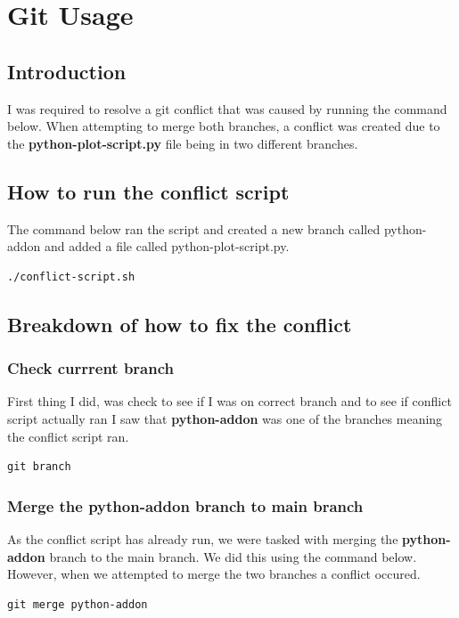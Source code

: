 \documentclass[]{article}
\begin{document}
\section{Git Usage}
\subsection{Introduction}
I was required to resolve a git conflict that was caused by running the command below. When attempting to merge both branches,
a conflict was created due to the \textbf{python-plot-script.py} file being in two different branches.
\subsection{How to run the conflict script}
The command below ran the script and created a new branch called python-addon and added a file called python-plot-script.py.
\begin{tcolorbox}[colback=white, colframe=black, boxrule=1pt, arc=2mm, 
    fonttitle=\bfseries, listing only, listing options={language=sh, basicstyle=\ttfamily}]
\begin{verbatim}
./conflict-script.sh
\end{verbatim}
\end{tcolorbox}
\subsection{Breakdown of how to fix the conflict}
\subsubsection{Check currrent branch}
First thing I did, was check to see if I was on correct branch and to see if conflict script actually ran
I saw that \textbf{python-addon} was one of the branches meaning the conflict script ran.
\begin{tcolorbox}[colback=white, colframe=black, boxrule=1pt, arc=2mm, 
    fonttitle=\bfseries, listing only, listing options={language=sh, basicstyle=\ttfamily}]
\begin{verbatim}
git branch
\end{verbatim}
\end{tcolorbox}
\subsubsection{Merge the python-addon branch to main branch}
As the conflict script has already run, we were tasked with merging the \textbf{python-addon} branch to the main
branch. We did this using the command below. However, when we attempted to merge the two branches a conflict occured.
\begin{tcolorbox}[colback=white, colframe=black, boxrule=1pt, arc=2mm, 
    fonttitle=\bfseries, listing only, listing options={language=sh, basicstyle=\ttfamily}]
\begin{verbatim}
git merge python-addon
\end{verbatim}
\end{tcolorbox}
\end{document}
